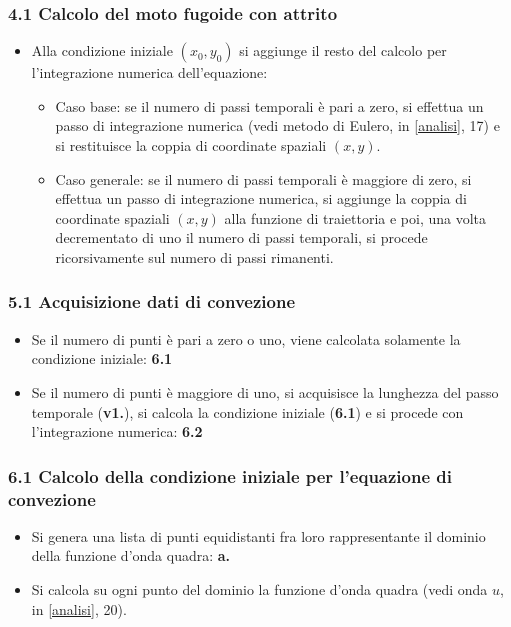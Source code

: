 \subsubsection*{4.1 Calcolo del moto fugoide con attrito}
\begin{itemize}
\item Alla condizione iniziale $(x_0,y_0)$ si aggiunge il resto del calcolo per l'integrazione numerica dell'equazione:
\begin{itemize}
\item Caso base: se il numero di passi temporali è pari a zero, si effettua un passo di integrazione numerica (vedi metodo di Eulero, in \ref{analisi}, 17) e si restituisce la coppia di coordinate spaziali $(x,y)$.
\item Caso generale: se il numero di passi temporali è maggiore di zero, si effettua un passo di integrazione numerica, si aggiunge la coppia di coordinate spaziali $(x,y)$ alla funzione di traiettoria e poi, una volta decrementato di uno il numero di passi temporali, si procede ricorsivamente sul numero di passi rimanenti. 
\end{itemize}
\end{itemize}

\subsubsection*{5.1 Acquisizione dati di convezione}
\begin{itemize}
\item Se il numero di punti è pari a zero o uno, viene calcolata solamente la condizione iniziale: \textbf{6.1}
\item Se il numero di punti è maggiore di uno, si acquisisce la lunghezza del passo temporale (\textbf{v1.}), si calcola la condizione iniziale (\textbf{6.1}) e si procede con l'integrazione numerica: \textbf{6.2} 
\end{itemize}

\subsubsection*{6.1 Calcolo della condizione iniziale per l'equazione di convezione}
\begin{itemize}
\item Si genera una lista di punti equidistanti fra loro rappresentante il dominio della funzione d'onda quadra: \textbf{a.} 
\item Si calcola su ogni punto del dominio la funzione d'onda quadra (vedi onda $u$, in \ref{analisi}, 20). 
\end{itemize}

